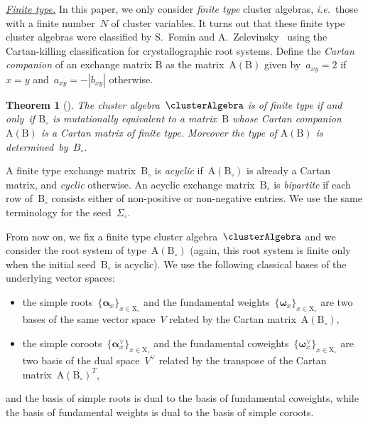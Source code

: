 \documentclass{amsart}
\newtheorem{theorem}{Theorem}[section]
\theoremstyle{definition}
\renewcommand{\b}[1]{{\boldsymbol{#1}}} %
\newcommand{\transpose}[1]{{#1}^T} %
\newcommand{\ie}{\textit{i.e.}~} %
\newcommand{\darkblue}{\color{darkblue}} %
\newcommand{\defn}[1]{\textsl{\darkblue #1}} %
\newcommand{\para}[1]{\medskip\noindent\uline{\textit{#1.}}} %
\newcommand{\seed}{\Sigma} %
\newcommand{\cluster}{\mathrm{X}} %
\newcommand{\B}{\mathrm{B}} %
\newcommand{\A}[1]{\mathrm{A}({#1})} %
\newcommand{\simpleRoot}{\b{\alpha}} %
\newcommand{\fundamentalWeight}{\b{\omega}} %
\begin{document}
\para{Finite type}
%
In this paper, we only consider \defn{finite type} cluster algebras, \ie those with a finite number~$N$ of cluster variables.
It turns out that these finite type cluster algebras were classified by S.~Fomin and A.~Zelevinsky~\cite{FominZelevinsky-ClusterAlgebrasII} using the Cartan-killing classification for crystallographic root systems.
Define the \defn{Cartan companion} of an exchange matrix $\B$ as the matrix~$\A{\B}$ given by~$a_{xy} = 2$ if~$x = y$ and~$a_{xy} = -|b_{xy}|$ otherwise.

\pagebreak

\begin{theorem}[{\cite[Thm.~1.4]{FominZelevinsky-ClusterAlgebrasII}}]
\label{thm:finiteTypeClassification}
The cluster algebra~$\clusterAlgebra$ is of finite type if and only~if $\B_\circ$ is mutationally equivalent to a matrix~$\B$ whose Cartan companion~$\A{\B}$ is a Cartan matrix of finite type. Moreover the type of $\A{\B}$ is determined~by~$B_\circ$.
\end{theorem}

A finite type exchange matrix~$\B_\circ$ is \defn{acyclic} if~$\A{\B_\circ}$ is already a Cartan matrix, and \defn{cyclic} otherwise.
An acyclic exchange matrix~$\B_\circ$ is \defn{bipartite} if each row of~$\B_\circ$ consists either of non-positive or non-negative entries.
We use the same terminology for the seed~$\seed_\circ$.

From now on, we fix a finite type cluster algebra~$\clusterAlgebra$ and we consider the root system of type~$\A{\B_\circ}$ (again, this root system is finite only when the initial seed~$\B_\circ$ is acyclic). We use the following classical bases of the underlying vector spaces:
\begin{itemize}
\item the simple roots~$\{\simpleRoot_x\}_{x \in \cluster_\circ}$ and the fundamental weights~$\{\fundamentalWeight_x\}_{x \in \cluster_\circ}$ are two bases of the same vector space~$V$ related by the Cartan matrix~$\A{\B_\circ}$,
\item the simple coroots~$\{\simpleRoot^\vee_x\}_{x \in \cluster_\circ}$ and the fundamental coweights~$\{\fundamentalWeight^\vee_x\}_{x \in \cluster_\circ}$ are two basis of the dual space~$V^\vee$ related by the transpose of the Cartan matrix~$\transpose{\A{\B_\circ}}$,
\end{itemize}
and the basis of simple roots is dual to the basis of fundamental coweights, while the basis of fundamental weights is dual to the basis of simple coroots.
\end{document}
